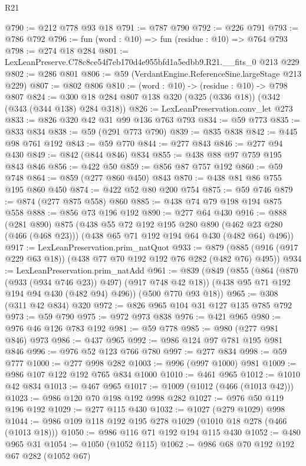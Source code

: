 \begin{lexlean}{R21}
\begin{coremodule}
@790 := @212 @778 @93 @18
@791 := @787 @790
@792 := @226 @791
@793 := @786 @792
@796 := fun (word : @10) => fun (residue : @10) => @764 @793
@798 := @274 @18 @284
@801 := LexLeanPreserve.C78c8ce54f7eb170d4e955bfd1a5edbb9.R21.__fits_0 @213 @229
@802 := @286 @801
@806 := @59 (VerdantEngine.ReferenceSine.largeStage @213 @229)
@807 := @802 @806
@810 := (word : @10) -> (residue : @10) -> @798 @807
@824 := @300 @18 @284 @807 @138 @320 (@325 (@336 @18)) (@342 (@343 (@344 @138) @284 @318))
@826 := LexLeanPreservation.conv_let @273
@833 := @826 @320 @42 @31 @99 @136 @763 @793
@834 := @59 @773
@835 := @833 @834
@838 := @59 (@291 @773 @790)
@839 := @835 @838
@842 := @445 @98 @761 @192
@843 := @59 @770
@844 := @277 @843
@846 := @277 @94 @430
@849 := @842 (@844 @846) @834
@855 := @438 @88 @97 @759 @195 @843 @846
@856 := @422 @50
@859 := @856 @87 @757 @192
@860 := @59 @748
@864 := @859 (@277 @860 @450) @843
@870 := @438 @81 @86 @755 @195 @860 @450
@874 := @422 @52 @80 @200 @754
@875 := @59 @746
@879 := @874 (@277 @875 @558) @860
@885 := @438 @74 @79 @198 @194 @875 @558
@888 := @856 @73 @196 @192
@890 := @277 @64 @430
@916 := @888
    (@281 @890)
    @875
    (@438
      @55
      @72
      @192
      @195
      @280
      @890
      (@462 @23 @280 (@466 (@468 @23)))
      (@438 @65 @71 @192 @194 @64 @430 (@482 @64) @496))
@917 := LexLeanPreservation.prim_natQuot
@933 := @879 (@885 (@916 (@917 @229 @63 @18)) (@438 @77 @70 @192 @192 @76 @282 (@482 @76) @495))
@934 := LexLeanPreservation.prim_natAdd
@961 := @839
    (@849
      (@855
        (@864 (@870 (@933 (@934 @746 @23)) @497) (@917 @748 @42 @18))
        (@438 @95 @71 @192 @194 @94 @430 (@482 @94) @496))
      (@500 @770 @93 @18))
@965 := @308 (@311 @42 @834) @320
@972 := @826 @965 @104 @31 @127 @135 @785 @792
@973 := @59 @790
@975 := @972 @973 @838
@976 := @421 @965
@980 := @976 @46 @126 @783 @192
@981 := @59 @778
@985 := @980 (@277 @981 @846) @973
@986 := @437 @965
@992 := @986 @124 @97 @781 @195 @981 @846
@996 := @976 @52 @123 @766 @780
@997 := @277 @834
@998 := @59 @777
@1000 := @277 @998 @282
@1003 := @996 (@997 @1000) @981
@1009 := @986 @107 @122 @192 @765 @834 @1000
@1010 := @461 @965
@1012 := @1010 @42 @834
@1013 := @467 @965
@1017 := @1009 (@1012 (@466 (@1013 @42)))
@1023 := @986 @120 @70 @198 @192 @998 @282
@1027 := @976 @50 @119 @196 @192
@1029 := @277 @115 @430
@1032 := @1027 (@279 @1029) @998
@1044 := @986 @109 @118 @192 @195 @278 @1029 (@1010 @18 @278 (@466 (@1013 @18)))
@1050 := @986 @116 @71 @192 @194 @115 @430
@1052 := @480 @965 @31
@1054 := @1050 (@1052 @115)
@1062 := @986 @68 @70 @192 @192 @67 @282 (@1052 @67)

\end{coremodule}
\end{lexlean}

